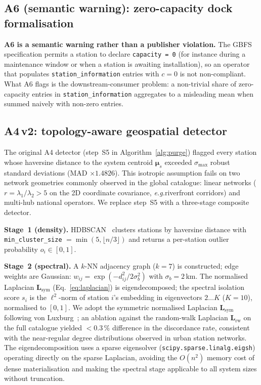 \documentclass[11pt,a4paper]{article}
\newcommand{\eg}{\emph{e.g.}}
\begin{document}
\subsection{A6 (semantic warning): zero-capacity dock formalisation}\label{secA6Formalisation}
\textbf{A6 is a semantic warning rather than a publisher violation.}
The GBFS specification permits a station to declare
\texttt{capacity = 0} (for instance during a maintenance window
or when a station is awaiting installation), so an operator that
populates \texttt{station\_information} entries with $c = 0$ is
not non-compliant. What A6 flags is the downstream-consumer
problem: a non-trivial share of zero-capacity entries in
\texttt{station\_information} aggregates to a misleading mean
when summed naively with non-zero entries.

\subsection{A4\,v2: topology-aware geospatial detector}\label{secA4v2}
The original A4 detector (step~S5 in Algorithm~\ref{alg:purge})
flagged every station whose haversine distance to the system centroid
$\boldsymbol{\mu}_s$ exceeded $\sigma_{\max}$ robust standard
deviations (MAD $\times 1.4826$). This isotropic assumption fails on
two network geometries commonly observed in the global catalogue:
linear networks ($r = \lambda_1/\lambda_2 > 5$ on the 2D coordinate
covariance, \eg riverfront corridors) and multi-hub national
operators. We replace step~S5 with a three-stage composite detector.

\textbf{Stage~1 (density).} HDBSCAN~\cite{Campello2013HDBSCAN,McInnes2017HDBSCAN}
clusters stations by haversine distance with \texttt{min\_cluster\_size}
$= \min(5, \lfloor n/3 \rfloor)$ and returns a per-station outlier
probability $o_i \in [0,1]$.

\textbf{Stage~2 (spectral).} A $k$-NN adjacency graph ($k=7$) is
constructed; edge weights are Gaussian:
$w_{ij} = \exp(-d_{ij}^2 / 2\sigma_b^2)$ with $\sigma_b = 2$\,km.
The normalised Laplacian $\mathbf{L}_{\text{sym}}$
(Eq.~\ref{eq:laplacian}) is eigendecomposed; the spectral isolation
score $s_i$ is the $\ell^2$-norm of station $i$'s embedding in
eigenvectors $2 \ldots K$ ($K = 10$), normalised to $[0,1]$.
We adopt the symmetric normalised Laplacian $\mathbf{L}_{\text{sym}}$
following von Luxburg~\cite{VonLuxburg2007}; an ablation against the
random-walk Laplacian $\mathbf{L}_{\text{rw}}$ on the full catalogue
yielded $< 0.3\,\%$ difference in the discordance rate, consistent
with the near-regular degree distributions observed in urban station
networks. The eigendecomposition uses a sparse eigensolver
(\texttt{scipy.sparse.linalg.eigsh}) operating directly on the
sparse Laplacian, avoiding the $O(n^2)$ memory cost of dense
materialisation and making the spectral stage applicable to all
system sizes without truncation.
\end{document}
